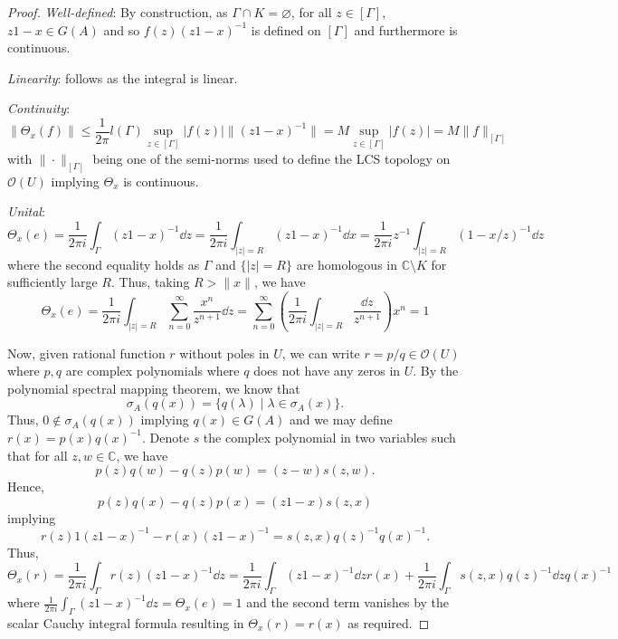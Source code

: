 \documentclass[]{article}
\theoremstyle{definition}
\begin{document}
\begin{proof}
  \textit{Well-defined}: By construction, as \(\Gamma \cap K = \varnothing\), for all \(z \in [\Gamma]\), 
  \(z1 - x \in G(A)\) and so \(f(z)(z1 - x)^{-1}\) is defined on \([\Gamma]\) and furthermore is continuous.

  \textit{Linearity}: follows as the integral is linear.

  \textit{Continuity}: 
  \[\|\Theta_x(f)\| \le \frac{1}{2\pi} l(\Gamma) \sup_{z \in [\Gamma]} |f(z)| \|(z1 - x)^{-1}\|
    = M\sup_{z \in [\Gamma]} |f(z)| = M \|f\|_{[\Gamma]}\]
  with \(\|\cdot\|_{[\Gamma]}\) being one of the semi-norms used to define the LCS topology on 
  \(\mathcal{O}(U)\) implying \(\Theta_x\) is continuous.

  \textit{Unital}: 
  \[\Theta_x(e) = \frac{1}{2\pi i} \int_\Gamma (z1 - x)^{-1} \dd z 
      = \frac{1}{2\pi i} \int_{|z| = R} (z1 - x)^{-1} \dd x
      = \frac{1}{2\pi i} z^{-1} \int_{|z| = R} (1 - x / z)^{-1} \dd z\]
  where the second equality holds as \(\Gamma\) and \(\{|z| = R\}\) are homologous in 
  \(\mathbb{C} \setminus K\) for sufficiently large \(R\). Thus, taking \(R > \|x\|\), we have 
  \[\Theta_x(e)  
    = \frac{1}{2\pi i} \int_{|z| = R} \sum_{n = 0}^\infty \frac{x^n}{z^{n + 1}} \dd z 
    = \sum_{n = 0}^\infty \left(\frac{1}{2\pi i} \int_{|z| = R} \frac{\dd z}{z^{n + 1}}\right) x^n = 1\]
  
  Now, given rational function \(r\) without poles in \(U\), we can write \(r = p / q \in \mathcal{O}(U)\) 
  where \(p, q\) are complex polynomials where \(q\) does not have any zeros in \(U\). By the polynomial 
  spectral mapping theorem, we know that 
  \[\sigma_A(q(x)) = \{q(\lambda) \mid \lambda \in \sigma_A(x)\}.\]
  Thus, \(0 \not\in \sigma_A(q(x))\) implying \(q(x) \in G(A)\) and we may define \(r(x) = p(x) q(x)^{-1}\).
  Denote \(s\) the complex polynomial in two variables such that for all \(z, w \in \mathbb{C}\), 
  we have
  \[p(z)q(w) - q(z)p(w) = (z - w)s(z, w).\]
  Hence, 
  \[p(z)q(x) - q(z)p(x) = (z1 - x)s(z, x)\]
  implying 
  \[r(z)1(z1 - x)^{-1} - r(x)(z1 - x)^{-1} = s(z, x)q(z)^{-1}q(x)^{-1}.\]
  Thus, 
  \[\Theta_x(r) = \frac{1}{2\pi i} \int_\Gamma r(z)(z1 - x)^{-1} \dd z 
    = \frac{1}{2\pi i}\int_\Gamma (z1 - x)^{-1} \dd z r(x) 
      + \frac{1}{2\pi i} \int_\Gamma s(z, x)q(z)^{-1} \dd z q(x)^{-1}\]
  where \(\frac{1}{2\pi i}\int_\Gamma (z1 - x)^{-1} \dd z = \Theta_x(e) = 1\) and the second term 
  vanishes by the scalar Cauchy integral formula resulting in \(\Theta_x(r) = r(x)\) as required.


\end{proof}
\end{document}
